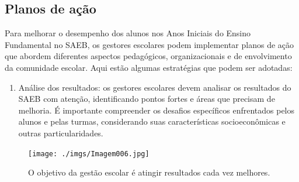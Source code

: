 \subsection{Planos de ação}\label{planos-de-auxe7uxe3o}

Para melhorar o desempenho dos alunos nos Anos Iniciais do Ensino
Fundamental no SAEB, os gestores escolares podem implementar planos de
ação que abordem diferentes aspectos pedagógicos, organizacionais e de
envolvimento da comunidade escolar. Aqui estão algumas estratégias que
podem ser adotadas:

\begin{enumerate}
\def\labelenumi{\arabic{enumi}.}
\tightlist
\item
  Análise dos resultados: os gestores escolares devem analisar os
  resultados do SAEB com atenção, identificando pontos fortes e áreas
  que precisam de melhoria. É importante compreender os desafios
  específicos enfrentados pelos alunos e pelas turmas, considerando suas
  características socioeconômicas e outras particularidades.
\end{enumerate}

\begin{figure}
\centering
\texttt{[image: ./imgs/Imagem006.jpg]}
\caption{O objetivo da gestão escolar é atingir resultados cada vez
melhores.}
\end{figure}

